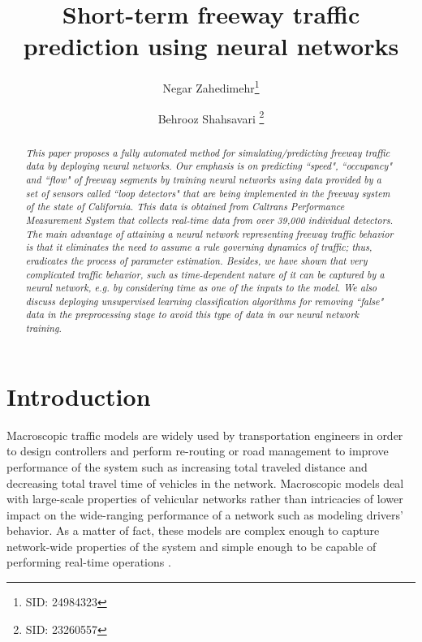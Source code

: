 \documentclass[twocolumn,10pt]{asme2e}
\title{Short-term freeway traffic prediction using neural networks}
\author{Negar Zahedimehr\thanks{SID: 24984323}
	\affiliation{
		Department of Mechanical Engineering\\
		University of California\\
		Berkeley, California 94720\\
		Email: negar.mehr@berkeley.edu
	}	
}
\author{Behrooz Shahsavari \thanks{SID: 23260557}
	\affiliation{Department of Mechanical Engineering\\
		University of California\\
		Berkeley, California 94720\\
		Email: behrooz@berkeley.edu
	}
}
\begin{document}
	
	\maketitle

\maketitle    

\begin{abstract}
{\it 
	This paper proposes a fully automated method for simulating/predicting freeway traffic data by deploying neural networks. Our emphasis is on predicting ``{speed}", ``{occupancy}" and ``{flow}" of freeway segments by training neural networks using data provided by a set of sensors called ``{loop detectors}" that are being implemented in the freeway system of the state of California. This data is obtained from Caltrans Performance Measurement System  that collects real-time data from over 39,000 individual detectors.
	The main advantage of attaining a neural network representing freeway traffic behavior is that it eliminates the need to assume a rule governing dynamics of traffic; thus, eradicates the process of parameter estimation. Besides, we have shown that very complicated traffic behavior, such as time-dependent nature of it can be captured by a neural network, e.g. by considering time as one of the inputs to the model. 
	We also discuss deploying unsupervised learning classification algorithms for removing ``false" data in the preprocessing stage to avoid this type of data in our neural network training.
}
\end{abstract}

\section{Introduction}

\par Macroscopic traffic models are widely used by transportation engineers in order to design controllers and perform re-routing or road management to improve performance of the system such as increasing total traveled distance and decreasing total travel time of vehicles in the network. Macroscopic models deal with large-scale properties of vehicular networks rather than intricacies of lower impact on the wide-ranging performance of a network such as modeling drivers' behavior. As a matter of fact, these models are complex enough to capture network-wide properties of the system and simple enough to be capable of performing real-time operations \cite{MacroModels}.
\end{document}
